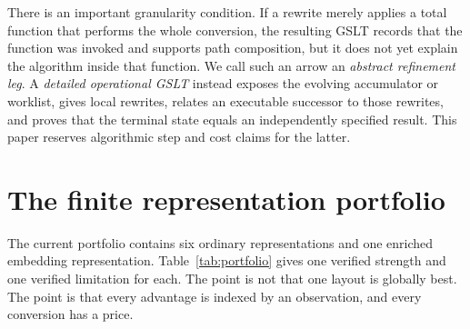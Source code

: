 \documentclass[11pt]{article}
\theoremstyle{remark}
\begin{document}
There is an important granularity condition.  If a rewrite merely applies a
total function that performs the whole conversion, the resulting GSLT records
that the function was invoked and supports path composition, but it does not
yet explain the algorithm inside that function.  We call such an arrow an
\emph{abstract refinement leg}.  A \emph{detailed operational GSLT} instead
exposes the evolving accumulator or worklist, gives local rewrites, relates an
executable successor to those rewrites, and proves that the terminal state
equals an independently specified result.  This paper reserves algorithmic
step and cost claims for the latter.

\section{The finite representation portfolio}
\label{sec:portfolio}

The current portfolio contains six ordinary representations and one enriched
embedding representation.  Table~\ref{tab:portfolio} gives one verified
strength and one verified limitation for each.  The point is not that one
layout is globally best.  The point is that every advantage is indexed by an
observation, and every conversion has a price.
\end{document}
